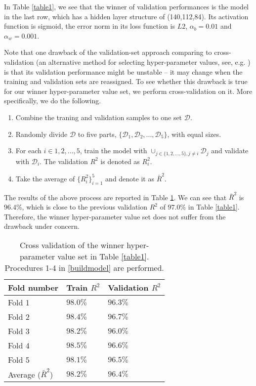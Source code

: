 \documentclass[thmsa,onecolumn,12pt]{article}%
\begin{document}
In Table \ref{table1}, we see that the winner of validation performances is the model in the last row, which has a hidden layer structure of (140,112,84). Its activation function is sigmoid, the error norm in its loss function is $L2$, $\alpha_b=0.01$ and $\alpha_w=0.001$.

Note that one drawback of the validation-set approach comparing to cross-validation (an alternative method for selecting hyper-parameter values, see, e.g. \cite[\S 7.10]{Hastie2009} ) is that its validation performance might be unstable -- it may change when the training and validation sets are reassigned. To see whether this drawback is true for our winner hyper-parameter value set, we perform cross-validation on it. More specifically, we do the following.




\begin{enumerate}
\item Combine the traning and validation samples to one set $\mathcal{D}$.
\item Randomly divide $\mathcal{D}$ to five parts, $\{\mathcal{D}_1, \mathcal{D}_2,...,\mathcal{D}_5 \}$, with equal sizes.
\item For each $i\in{1,2,...,5}$, train the model with $\cup_{j\in\{1,2,...,5\}, j\neq i}\mathcal{D}_j$ and validate with $\mathcal{D}_i$. The validation $R^2$ is denoted as $R^2_i$.
\item Take the average of $\{R^2_i\}_{i=1}^5$ and denote it as $\bar{R}^2$.
\end{enumerate}
The results of the above process are reported in Table \ref{table2}. We can see that $\bar{R}^2$ is $96.4\%$, which is close to the previous validation $R^2$ of $97.0\%$ in Table \ref{table1}. Therefore, the winner hyper-parameter value set does not suffer from the drawback under concern.

\begin{table}[H]
\caption{Cross validation of the winner hyper-parameter value set in Table \ref{table1}. Procedures 1-4 in \ref{buildmodel} are performed.}
\label{table2}
\centering%
\begin{tabular}{ p{3cm}  p{3cm}p{3cm}  }
\toprule%
Fold number                 & Train $R^2$  & Validation $R^2$\\
\toprule
Fold 1      				 &$98.0\%$        &$96.3\%$ \\
Fold 2      				 &$98.4\%$        &$96.7\%$ \\
Fold 3      				 &$98.2\%$        &$96.0\%$ \\
Fold 4       			&$98.5\%$        &$96.6\%$ \\
Fold 5      				 &$98.1\%$        &$96.5\%$ \\
Average ($\bar{R}^2$)   			&$98.2\%$        &$96.4\%$\\
\bottomrule
\end{tabular}
\end{table}
\end{document}
